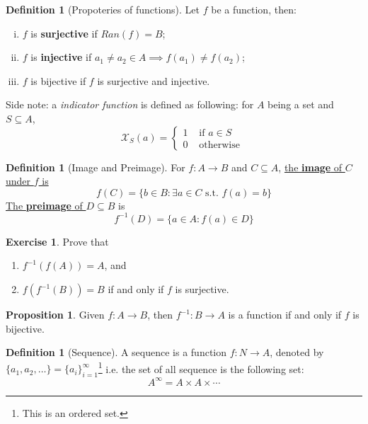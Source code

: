 \documentclass[12pt]{article}
\theoremstyle{definition}
\newtheorem{definition}[theorem]{Definition}
\newtheorem*{exercise_nonum}{Exercise}
\newtheorem{proposition}[theorem]{Proposition}
\theoremstyle{plain}
\begin{document}
\begin{definition}
    [Propoteries of functions] Let $f$ be a function, then:
    \begin{enumerate}[(i)]
        \item $f$ is \textbf{surjective} if $Ran(f) = B$; 
        \item $f$ is \textbf{injective} if $a_1 \not = a_2 \in A \implies f(a_1)
            \not = f(a_2)$; 
        \item $f$ is bijective if $f$ is surjective and injective.
    \end{enumerate}
\end{definition}

\noindent Side note: a \textit{indicator function} is defined as following: for
$A$ being a set and $S\subseteq A$,
\[
    \mathcal X_S(a) =
    \begin{cases}
        1 & \text{ if } a \in S \\
        0 & \text{ otherwise }
    \end{cases}
\]

\begin{definition}
    [Image and Preimage]

    For $f: A \to B$ and $C\subseteq A$, \underline{ the \textbf{image} of $C$ under
    $f$ is }
    \[
        f(C) =
        \{
            b \in B : \exists a \in C \text{ s.t. } f(a) = b
        \}
    \]
    \underline{The \textbf{preimage} of $D\subseteq B$} is
    \[
        f^{-1}(D) =
        \{
            a \in A : f(a) \in D
        \}
    \]

\end{definition}

\begin{exercise_nonum}
    Prove that
    \begin{enumerate}
        \item $f^{-1}(f(A)) = A$, and
        \item $f(f^{-1}(B)) = B$ if and only if $f$ is surjective.
    \end{enumerate}
\end{exercise_nonum}

\begin{proposition}
    Given $f: A \to B$, then $f^{-1}: B \to A$ is a function if and only if $f$
    is bijective.
\end{proposition}

\begin{definition}
    [Sequence]

    A sequence is a function $f: N \to A$, denoted by $\{a_1, a_2, \ldots\} = \{
    a_i \}_{i=1}^\infty $\footnote{This is an ordered set.}
    i.e. the set of all sequence is the following set:
    \[
        A^\infty = A \times A \times \cdots
    \]
\end{definition}
\end{document}
